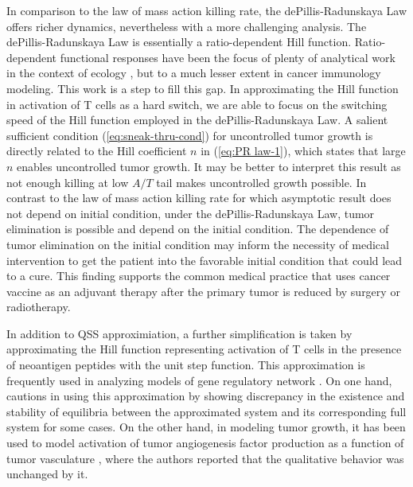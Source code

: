 \documentclass[review,authoryear]{elsarticle}
\begin{document}
In comparison to the law of mass action killing rate, the dePillis-Radunskaya
Law offers richer dynamics, nevertheless with a more challenging analysis. The
dePillis-Radunskaya Law is essentially a ratio-dependent Hill function.
Ratio-dependent functional responses have been the focus of plenty
of analytical work in the context of ecology \citep{Abrams2000,Hsu2001,Hsu2003}, but to a much lesser extent in cancer
immunology modeling. This work is a step to fill this gap. In approximating
the Hill function in activation of T cells as a hard switch, we are
able to focus on the switching speed of the Hill function employed
in the dePillis-Radunskaya Law. A salient sufficient condition (\ref{eq:sneak-thru-cond}) for
uncontrolled tumor growth is directly related to the Hill coefficient $n$ in (\ref{eq:PR law-1}), which states that large $n$ enables
uncontrolled tumor growth. It may be better to interpret this result as not
enough killing at low $A/T$ tail makes uncontrolled growth possible.
In contrast to the law of mass action killing rate for which asymptotic
result does not depend on initial condition, under the dePillis-Radunskaya
Law, tumor elimination is possible and depend on the initial
condition. The dependence of tumor elimination on the initial condition may inform the necessity of medical intervention to get
the patient into the favorable initial condition that could lead to
a cure. This finding supports the common medical practice
that uses cancer vaccine as an adjuvant therapy after the primary
tumor is reduced by surgery or radiotherapy.

In addition to QSS approximiation, a further simplification is taken by approximating the Hill function representing activation of T cells in the presence of neoantigen
peptides with the unit step function. This approximation
is frequently used in analyzing models of gene regulatory network
 \citep[e.g.,][]{Glass1973,Mestl1995}. On one hand, \citet{Polynikis2009} cautions in using this approximation by showing discrepancy in the existence and stability of equilibria between the approximated system and its corresponding full system for some cases. On the other hand, in modeling tumor growth, it has been used to model activation of tumor angiogenesis factor production as a function of tumor vasculature \citep{Stamper2007}, where the authors reported that the qualitative behavior was unchanged by it.
\end{document}
